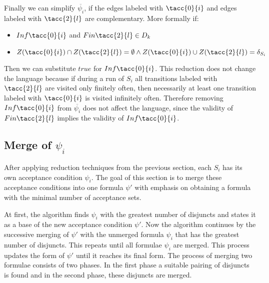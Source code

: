 \documentclass[a4paper,UKenglish,cleveref, autoref, anonymous, thm-restate]{lipics-v2021}
\def\Inf{\ensuremath{\mathsf{Inf}}}
\def\Fin{\ensuremath{\mathsf{Fin}}}
\def\true{\mathit{true}}
\begin{document}
Finally we can simplify $\overline{\psi_{i}}$, if the edges labeled with $\tacc{0}{i}$ and edges labeled with $\tacc{2}{l}$ are complementary.
More formally if:
\begin{itemize}
    \item  $\Inf\tacc{0}{i}$ and $\Fin\tacc{2}{l} \in D_{k}$
    \item $Z(\tacc{0}{i}) \cap Z(\tacc{2}{l}) = \emptyset \land Z(\tacc{0}{i}) \cup Z(\tacc{2}{l}) = \delta_{S_{i}} $
\end{itemize}
Then we can substitute $\true$ for $\Inf\tacc{0}{i}$.
This reduction does not change the language because if during a run of $S_{i}$ all transitions labeled with $\tacc{2}{l}$ are visited only finitely often, then necessarily at least one transition labeled with $\tacc{0}{i}$ is visited infinitely often. Therefore removing $\Inf\tacc{0}{i}$ from $\overline{\psi_{i}}$ does not affect the language, since the validity of $\Fin\tacc{2}{l}$ implies the validity of $\Inf\tacc{0}{i}$.

\subsection{Merge of $\psi_{i}$}
After applying reduction techniques from the previous section, each $S_{i}$ has its own acceptance condition $\psi_{i}$. The goal of this section is to merge these acceptance conditions into one formula $\psi'$ with emphasis on obtaining a formula with the minimal number of acceptance sets.

At first, the algorithm finds $\psi_{i}$ with the greatest number of disjuncts and states it as a base of the new acceptance condition $\psi'$. Now the algorithm continues by the successive merging of $\psi'$ with the unmerged formula $\psi_{i}$ that has the greatest number of disjuncts. This repeats until all formulae $\psi_{i}$ are merged. This process updates the form of $\psi'$ until it reaches its final form. The process of merging two formulae consists of two phases. In the first phase a suitable pairing of disjuncts is found and in the second phase, these disjuncts are merged.
\end{document}
